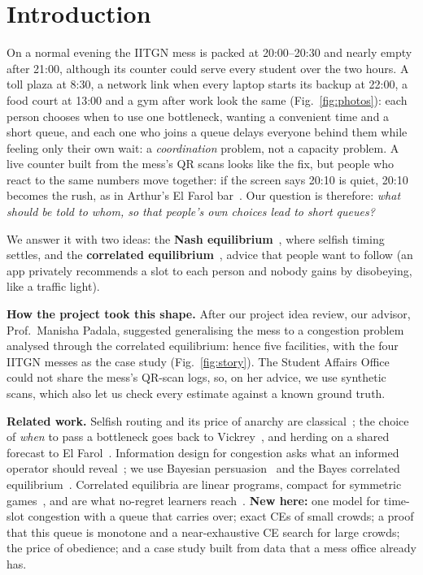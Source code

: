 \documentclass{article}
\begin{document}

\section{Introduction}
On a normal evening the IITGN mess is packed at 20:00--20:30 and nearly empty after 21:00, although its counter
could serve every student over the two hours. A toll plaza at 8:30, a network link when every laptop starts its
backup at 22:00, a food court at 13:00 and a gym after work look the same (Fig.~\ref{fig:photos}): each person chooses when to use one
bottleneck, wanting a convenient time and a short queue, and each one who joins a queue delays everyone behind them
while feeling only their own wait: a \emph{coordination} problem, not a capacity problem. A live counter built from
the mess's QR scans looks like the fix, but people who react to the same numbers move together: if the screen says
20:10 is quiet, 20:10 becomes the rush, as in Arthur's El Farol bar~\cite{arthur}. Our question is therefore: \emph{what should be told to whom, so that people's own choices
lead to short queues?}

We answer it with two ideas: the \textbf{Nash equilibrium}~\cite{nash}, where selfish timing settles, and the
\textbf{correlated equilibrium}~\cite{aumann}, advice that people want to follow (an app privately recommends a slot
to each person and nobody gains by disobeying, like a traffic light).

\textbf{How the project took this shape.} After our project idea review, our advisor, Prof.~Manisha Padala,
suggested generalising the mess to a congestion problem analysed through the correlated equilibrium: hence five
facilities, with the four IITGN messes as the case study (Fig.~\ref{fig:story}). The Student Affairs Office could not
share the mess's QR-scan logs, so, on her advice, we use synthetic scans, which also let us check every estimate
against a known ground truth.

\textbf{Related work.} Selfish routing and its price of anarchy are classical~\cite{rosenthal,koutsoupias,roughgarden};
the choice of \emph{when} to pass a bottleneck goes back to Vickrey~\cite{vickrey}, and herding on a shared forecast
to El Farol~\cite{arthur}. Information design for congestion asks what an informed operator should
reveal~\cite{das,acemoglu}; we use Bayesian persuasion~\cite{kamenica} and the Bayes correlated
equilibrium~\cite{bergemann}. Correlated equilibria are linear programs, compact for symmetric
games~\cite{papadimitriou}, and are what no-regret learners reach~\cite{hart,blum}. \textbf{New here:} one model
for time-slot congestion with a queue that carries over; exact CEs of small crowds; a proof that this queue is
monotone and a near-exhaustive CE search for large crowds; the price of obedience; and a case study built from data
that a mess office already has.
\end{document}
